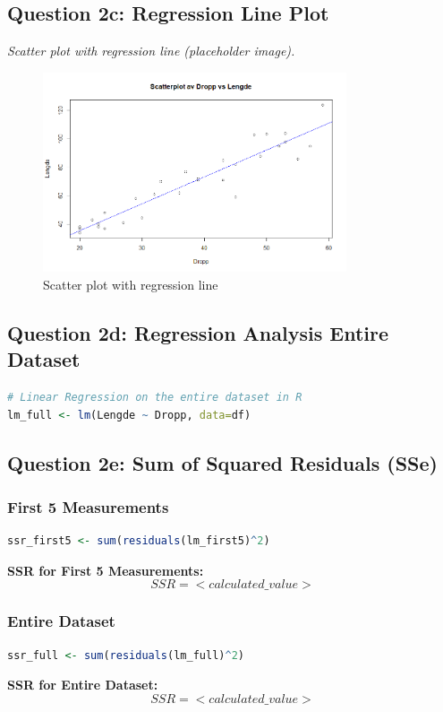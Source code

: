 \documentclass{article}
\begin{document}
\subsection{Question 2c: Regression Line Plot}
\textit{Scatter plot with regression line (placeholder image).}
\begin{figure}[h]
    \centering
    \includegraphics[width=0.8\textwidth]{Rplot02.png}
    \caption{Scatter plot with regression line}
\end{figure}

\subsection{Question 2d: Regression Analysis Entire Dataset}
\begin{lstlisting}[language=R]
# Linear Regression on the entire dataset in R
lm_full <- lm(Lengde ~ Dropp, data=df)
\end{lstlisting}

\subsection{Question 2e: Sum of Squared Residuals (SSe)}
\subsubsection{First 5 Measurements}
\begin{lstlisting}[language=R]
ssr_first5 <- sum(residuals(lm_first5)^2)
\end{lstlisting}
\textbf{SSR for First 5 Measurements:} \[ SSR = <calculated\_value> \]

\subsubsection{Entire Dataset}
\begin{lstlisting}[language=R]
ssr_full <- sum(residuals(lm_full)^2)
\end{lstlisting}
\textbf{SSR for Entire Dataset:} \[ SSR = <calculated\_value> \]
\end{document}
